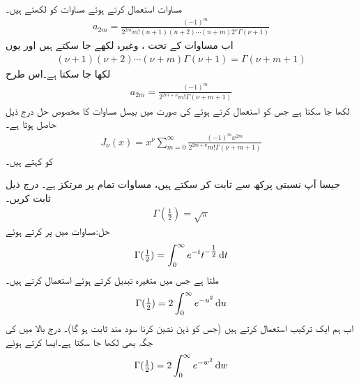 مساوات  استعمال کرتے ہوئے  مساوات  کو لکھتے ہیں۔
\begin{align*}
a_{2m}=\frac{(-1)^m }{2^{2m}m!(n+1)(n+2)\cdots (n+m)2^{\nu}\Gamma(\nu+1)}
\end{align*}
اب مساوات  کے تحت ، 
 وغیرہ لکھے جا سکتے ہیں اور یوں
\begin{align*}
(\nu+1)(\nu+2)\cdots (\nu+m)\Gamma(\nu+1)=\Gamma(\nu+m+1)
\end{align*}
لکھا جا سکتا ہے۔اس طرح  
\begin{align}
a_{2m}=\frac{(-1)^m}{2^{2m+\nu}m!\Gamma(\nu+m+1)}
\end{align}
لکھا جا سکتا ہے جس کو استعمال کرتے ہوئے  کی صورت میں بیسل مساوات  کا مخصوص حل درج ذیل حاصل ہوتا ہے۔
\begin{align}\label{مساوات_بیسل_تسلسل_عمومی}
J_{\nu}(x)=x^{\nu}\sum_{m=0}^{\infty}\frac{(-1)^m x^{2m}}{2^{2m+\nu}m!\Gamma(\nu+m+1)}
\end{align}
 کو    کہتے ہیں۔

جیسا آپ   نسبتی پرکھ سے ثابت کر سکتے ہیں، مساوات  تمام  پر مرتکز ہے۔
درج ذیل ثابت کریں۔
\begin{align}\label{مساوات_بیسل_گیما_نیم}
\Gamma(\tfrac{1}{2})=\sqrt{\pi}
\end{align}
حل:مساوات  میں  پر کرتے ہوئے 
\begin{align*}
\Gamma(\tfrac{1}{2})=\int_{0}^{\infty}e^{-t} t^{-\tfrac{1}{2}}\dif t
\end{align*}
ملتا ہے جس میں متغیرہ تبدیل کرتے ہوئے  استعمال کرتے ہیں۔
\begin{align*}
\Gamma(\tfrac{1}{2})=2\int_{0}^{\infty}e^{-u^2}\dif u
\end{align*}
اب ہم ایک ترکیب استعمال کرتے ہیں (جس کو ذہن نشین کرنا سود مند ثابت ہو گا)۔ درج بالا میں  کی جگہ  بھی لکھا جا سکتا ہے۔ایسا کرتے ہوئے 
\begin{align*}
\Gamma(\tfrac{1}{2})=2\int_{0}^{\infty}e^{-w^2}\dif w
\end{align*}

